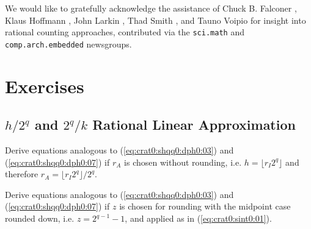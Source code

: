 We would like to gratefully acknowledge the assistance of
  Chuck B. Falconer  \cite{bibref:i:chuckbfalconer},
     Klaus Hoffmann     \cite{bibref:i:klaushoffmann},
        John Larkin        \cite{bibref:i:johnlarkin},
         Thad Smith         \cite{bibref:i:thadsmith},
and
       Tauno Voipio       \cite{bibref:i:taunovoipio}
for insight into rational counting approaches, contributed via the 
\texttt{sci.math} \cite{bibref:n:scimathnewsgroup}
and 
\texttt{comp.arch.embedded} \cite{bibref:n:comparchembedded}
newsgroups.


\section{Exercises}

\subsection[\protect\mbox{\protect$h/2^q$} and  \protect\mbox{\protect$2^q/k$} Rational Linear Approximation]
           {\protect\mbox{\protect\boldmath$h/2^q$} and \protect\mbox{\protect\boldmath$2^q/k$} Rational Linear Approximation}

\begin{vworkexercisestatement}
\label{exe:crat0:sexe0:a01}
Derive equations analogous to (\ref{eq:crat0:shqq0:dph0:03})
and (\ref{eq:crat0:shqq0:dph0:07}) if $r_A$ is chosen
without rounding, i.e. 
$h=\lfloor r_I 2^q \rfloor$ and therefore
$r_A=\lfloor r_I 2^q \rfloor/2^q$.
\end{vworkexercisestatement}
\vworkexercisefooter{}

\begin{vworkexercisestatement}
\label{exe:crat0:sexe0:a02}
Derive equations analogous to (\ref{eq:crat0:shqq0:dph0:03})
and (\ref{eq:crat0:shqq0:dph0:07}) if 
$z$ is chosen for rounding with the midpoint case rounded
down, i.e. $z=2^{q-1}-1$, and applied as in 
(\ref{eq:crat0:sint0:01}).
\end{vworkexercisestatement}
\vworkexercisefooter{}

